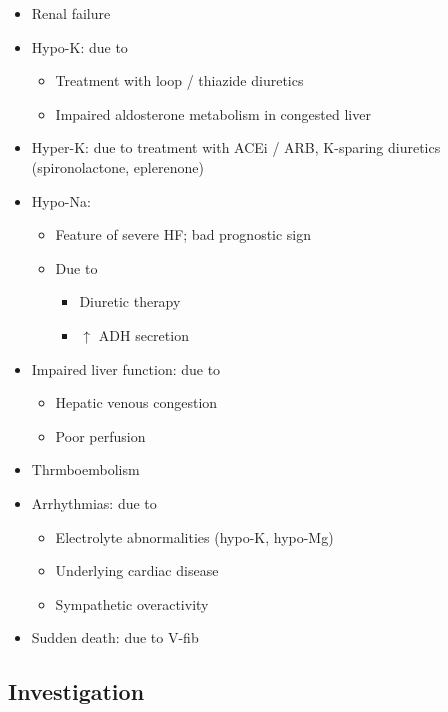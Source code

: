 \documentclass[
  12pt,
]{memoir}
\providecommand{\tightlist}{%
  \setlength{\itemsep}{0pt}\setlength{\parskip}{0pt}}
\begin{document}
\begin{itemize}
\tightlist
\item
  Renal failure
\item
  Hypo-K: due to

  \begin{itemize}
  \tightlist
  \item
    Treatment with loop / thiazide diuretics
  \item
    Impaired aldosterone metabolism in congested liver
  \end{itemize}
\item
  Hyper-K: due to treatment with ACEi / ARB, K-sparing diuretics
  (spironolactone, eplerenone)
\item
  Hypo-Na:

  \begin{itemize}
  \tightlist
  \item
    Feature of severe HF; bad prognostic sign
  \item
    Due to

    \begin{itemize}
    \tightlist
    \item
      Diuretic therapy
    \item
      \(\uparrow\) ADH secretion
    \end{itemize}
  \end{itemize}
\item
  Impaired liver function: due to

  \begin{itemize}
  \tightlist
  \item
    Hepatic venous congestion
  \item
    Poor perfusion
  \end{itemize}
\item
  Thrmboembolism
\item
  Arrhythmias: due to

  \begin{itemize}
  \tightlist
  \item
    Electrolyte abnormalities (hypo-K, hypo-Mg)
  \item
    Underlying cardiac disease
  \item
    Sympathetic overactivity
  \end{itemize}
\item
  Sudden death: due to V-fib
\end{itemize}

\hypertarget{investigation-2}{%
\subsection{Investigation}\label{investigation-2}}
\end{document}
